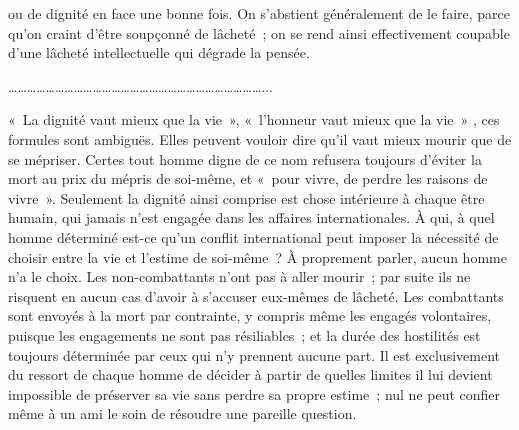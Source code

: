 \documentclass[french,twoside]{book} %
\begin{document}
ou de dignité en face une bonne fois. On s'abstient généralement de le faire, parce qu'on craint d'être soupçonné de lâcheté ; on se rend ainsi effectivement coupable d'une lâcheté intellectuelle qui dégrade la pensée.\par
………………………………………………………………………...\par
« La dignité vaut mieux que la vie », « l'honneur vaut mieux que la vie » , ces formules sont ambiguës. Elles peuvent vouloir dire qu'il vaut mieux mourir que de se mépriser. Certes tout homme digne de ce nom refusera toujours d'éviter la mort au prix du mépris de soi-même, et « pour vivre, de perdre les raisons de vivre ». Seulement la dignité ainsi comprise est chose intérieure à chaque être humain, qui jamais n'est engagée dans les affaires internationales. À qui, à quel homme déterminé est-ce qu'un conflit interna­tional peut imposer la nécessité de choisir entre la vie et l'estime de soi-même ? À proprement parler, aucun homme n'a le choix. Les non-combattants n'ont pas à aller mourir ; par suite ils ne risquent en aucun cas d'avoir à s'accuser eux-mêmes de lâcheté. Les combattants sont envoyés à la mort par contrainte, y compris même les engagés volontaires, puisque les engagements ne sont pas résiliables ; et la durée des hostilités est toujours déterminée par ceux qui n'y prennent aucune part. Il est exclusivement du ressort de chaque homme de décider à partir de quelles limites il lui devient impossible de préserver sa vie sans perdre sa propre estime ; nul ne peut confier même à un ami le soin de résoudre une pareille question.
\end{document}
